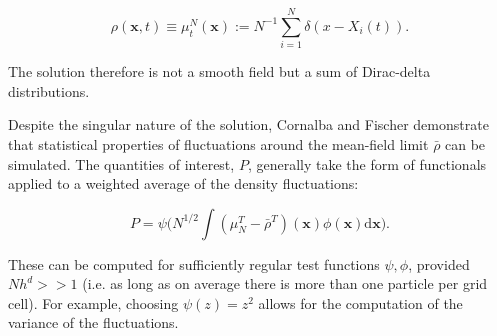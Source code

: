 \begin{equation*}
    \rho(\mathbf{x},t) \equiv \mu_t^N(\mathbf{x}) := N^{-1} \sum_{i=1}^N\delta(x - X_i(t)).
\end{equation*}

The solution therefore is not a smooth field but a sum 
of Dirac-delta distributions. 

Despite the singular nature of the solution, 
Cornalba and Fischer \cite{cornalba2025multilevel} demonstrate that
statistical properties of fluctuations 
around the mean-field limit $\bar{\rho}$ can be simulated. 
The quantities of interest, $P$, generally take the form of functionals applied 
to a weighted average of the density fluctuations:

\begin{equation} 
    P = \psi\big(N^{1/2} \int (\mu_N^T - \bar{\rho}^T)(\mathbf{x})
    \phi(\mathbf{x})\mathrm{d}\mathbf{x}\big).
\end{equation}

These can be computed
for sufficiently regular test functions $\psi, \phi$, provided $Nh^d >> 1$
(i.e. as long as on average there is more than one particle per grid cell).
For example, choosing $\psi(z) = z^2$ allows for the computation of the 
variance of the fluctuations.




